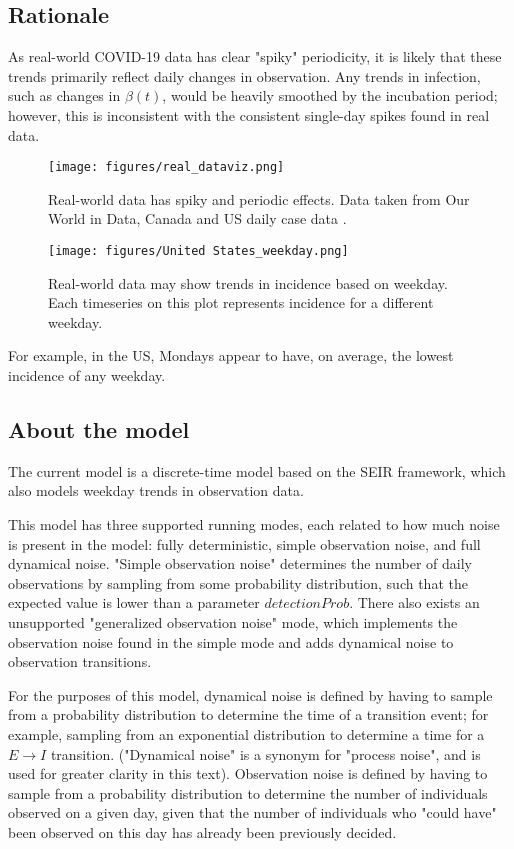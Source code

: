 \documentclass{article}
\begin{document}
\subsection{Rationale}
As real-world COVID-19 data has clear "spiky" periodicity, it is likely that these trends primarily reflect daily changes in observation. Any trends in infection, such as changes in $\beta(t)$, would be heavily smoothed by the incubation period; however, this is inconsistent with the consistent single-day spikes found in real data. 

\clearpage
\begin{figure}
    \centering
    \texttt{[image: figures/real\_dataviz.png]}
    \caption{Real-world data has spiky and periodic effects. Data taken from Our World in Data, Canada and US daily case data \cite{OWID}.}
    \label{fig:my_label}
\end{figure}

\clearpage
\begin{figure}
	\centering
    \texttt{[image: figures/United States\_weekday.png]}
    \caption{Real-world data may show trends in incidence based on weekday. Each timeseries on this plot represents incidence for a different weekday. }
    \label{fig:my_label}
\end{figure}

For example, in the US, Mondays appear to have, on average, the lowest incidence of any weekday.


\subsection{About the model}
The current model is a discrete-time model based on the SEIR framework, which also models weekday trends in observation data. 

This model has three supported running modes, each related to how much noise is present in the model: fully deterministic, simple observation noise, and full dynamical noise. "Simple observation noise" determines the number of daily observations by sampling from some probability distribution, such that the expected value is lower than a parameter $detectionProb$. There also exists an unsupported "generalized observation noise" mode, which implements the observation noise found in the simple mode and adds dynamical noise to observation transitions.

For the purposes of this model, dynamical noise is defined by having to sample from a probability distribution to determine the time of a transition event; for example, sampling from an exponential distribution to determine a time for a $E \rightarrow I$ transition. ("Dynamical noise" is a synonym for "process noise", and is used for greater clarity in this text). Observation noise is defined by having to sample from a probability distribution to determine the number of individuals observed on a given day, given that the number of individuals who "could have" been observed on this day has already been previously decided.
\end{document}
